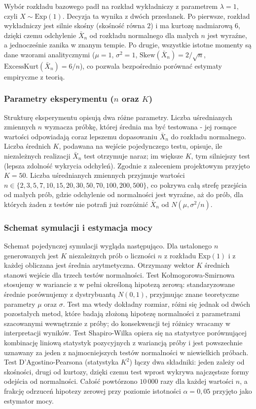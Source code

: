 \documentclass[12pt,a4paper]{article}
\begin{document}
Wybór rozkładu bazowego padł na rozkład wykładniczy z parametrem $\lambda = 1$, czyli $X \sim \mathrm{Exp}(1)$. Decyzja ta wynika z dwóch przesłanek. Po pierwsze, rozkład wykładniczy jest silnie skośny (skośność równa $2$) i ma kurtozę nadmiarową $6$, dzięki czemu odchylenie $\bar{X}_n$ od rozkładu normalnego dla małych $n$ jest wyraźne, a jednocześnie zanika w znanym tempie. Po drugie, wszystkie istotne momenty są dane wzorami analitycznymi ($\mu = 1$, $\sigma^2 = 1$, $\mathrm{Skew}(\bar{X}_n) = 2/\sqrt{n}$, $\mathrm{ExcessKurt}(\bar{X}_n) = 6/n$), co pozwala bezpośrednio porównać estymaty empiryczne z teorią.

\subsubsection{Parametry eksperymentu ($n$ oraz $K$)}

Strukturę eksperymentu opisują dwa różne parametry. Liczba uśrednianych zmiennych $n$ wyznacza próbkę, której średnia ma być testowana - jej rosnące wartości odpowiadają coraz lepszemu dopasowaniu $\bar{X}_n$ do rozkładu normalnego. Liczba średnich $K$, podawana na wejście pojedynczego testu, opisuje, ile niezależnych realizacji $\bar{X}_n$ test otrzymuje naraz; im większe $K$, tym silniejszy test (lepsza zdolność wykrycia odchyleń). Zgodnie z zaleceniem projektowym przyjęto $K = 50$. Liczba uśrednianych zmiennych przyjmuje wartości $n \in \{2, 3, 5, 7, 10, 15, 20, 30, 50, 70, 100, 200, 500\}$, co pokrywa całą strefę przejścia od małych prób, gdzie odchylenie od normalności jest wyraźne, aż do prób, dla których żaden z testów nie potrafi już rozróżnić $\bar{X}_n$ od $N(\mu, \sigma^2/n)$.

\subsubsection{Schemat symulacji i estymacja mocy}

Schemat pojedynczej symulacji wygląda następująco. Dla ustalonego $n$ generowanych jest $K$ niezależnych prób o liczności $n$ z rozkładu $\mathrm{Exp}(1)$ i z każdej obliczana jest średnia arytmetyczna. Otrzymany wektor $K$ średnich stanowi wejście dla trzech testów normalności. Test Kołmogorowa-Smirnowa stosujemy w wariancie z w pełni określoną hipotezą zerową: standaryzowane średnie porównujemy z dystrybuantą $N(0,1)$, przyjmując znane teoretyczne parametry $\mu$ oraz $\sigma$. Test ma wtedy dokładny rozmiar, różni się jednak od dwóch pozostałych metod, które badają złożoną hipotezę normalności z parametrami szacowanymi wewnętrznie z próby; do konsekwencji tej różnicy wracamy w interpretacji wyników. Test Shapiro-Wilka opiera się na statystyce porównującej kombinację liniową statystyk pozycyjnych z wariancją próby i jest powszechnie uznawany za jeden z najmocniejszych testów normalności w niewielkich próbach. Test D'Agostino-Pearsona (statystyka $K^2$) łączy dwa składniki: jeden zależy od skośności, drugi od kurtozy, dzięki czemu test wprost wykrywa najczęstsze formy odejścia od normalności. Całość powtórzono $10\,000$ razy dla każdej wartości $n$, a frakcję odrzuceń hipotezy zerowej przy poziomie istotności $\alpha = 0{,}05$ przyjęto jako estymator mocy.
\end{document}
